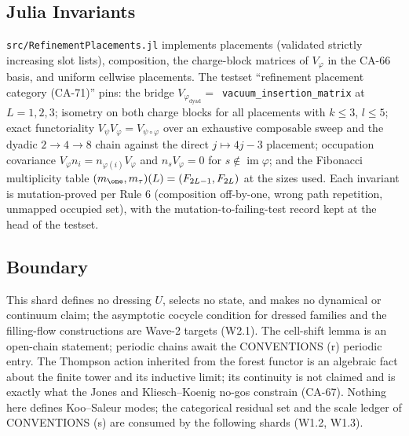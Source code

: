 \subsection{Julia Invariants}

\texttt{src/RefinementPlacements.jl} implements placements (validated
strictly increasing slot lists), composition, the charge-block matrices of
\(V_\varphi\) in the CA-66 basis, and uniform cellwise placements.  The
testset ``refinement placement category (CA-71)'' pins: the bridge
\(V_{\varphi_{\mathrm{dyad}}}=\)~\texttt{vacuum\_insertion\_matrix} at
\(L=1,2,3\); isometry on both charge blocks for all placements with
\(k\le3\), \(l\le5\); exact functoriality
\(V_\psi V_\varphi=V_{\psi\circ\varphi}\) over an exhaustive composable
sweep and the dyadic \(2\to4\to8\) chain against the direct
\(j\mapsto4j-3\) placement; occupation covariance
\(V_\varphi n_i=n_{\varphi(i)}V_\varphi\) and
\(n_sV_\varphi=0\) for \(s\notin\operatorname{im}\varphi\); and the
Fibonacci multiplicity table \((m_{\one},m_\tau)(L)=(F_{2L-1},F_{2L})\) at
the sizes used.  Each invariant is mutation-proved per Rule 6 (composition
off-by-one, wrong path repetition, unmapped occupied set), with the
mutation-to-failing-test record kept at the head of the testset.

\subsection{Boundary}

This shard defines no dressing \(U\), selects no state, and makes no
dynamical or continuum claim; the asymptotic cocycle condition for dressed
families and the filling-flow constructions are Wave-2 targets (W2.1).  The
cell-shift lemma is an open-chain statement; periodic chains await the
CONVENTIONS (r) periodic entry.  The Thompson action inherited from the
forest functor is an algebraic fact about the finite tower and its inductive
limit; its continuity is not claimed and is exactly what the Jones and
Kliesch--Koenig no-gos constrain (CA-67).  Nothing here defines Koo--Saleur
modes; the categorical residual set and the scale ledger of CONVENTIONS (s)
are consumed by the following shards (W1.2, W1.3).
